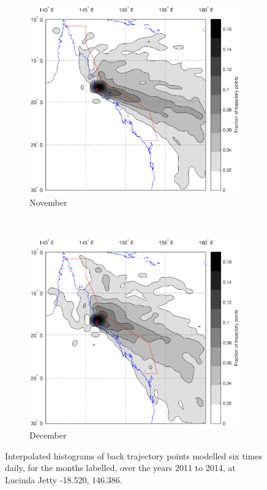 \clearpage
	
\begin{figure}[!t]\ContinuedFloat
    \centering
    \begin{subfigure}[b]{0.45\textwidth}
	    \includegraphics[width=\textwidth]{Fig/Research/BT_Coast/Map_115.eps}
	    \caption{November}
	    \label{subfig:cair}
    \end{subfigure}
    ~
    \begin{subfigure}[b]{0.45\textwidth}
	    \includegraphics[width=\textwidth]{Fig/Research/BT_Coast/Map_125.eps}
	    \caption{December}
	    \label{subfig:cair}
    \end{subfigure}
    \caption{Interpolated histograms of back trajectory points modelled six times daily, for the months labelled, over the years 2011 to 2014, at Lucinda Jetty -18.520, 146.386.}
    \label{fig:btcoastlucjet}
\end{figure}


